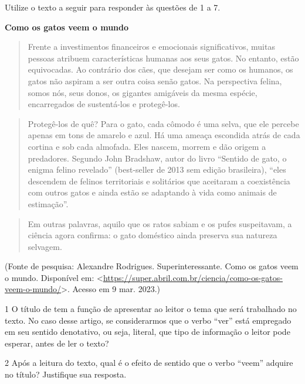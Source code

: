 Utilize o texto a seguir para responder às questões de 1 a 7.

\textbf{Como os gatos veem o mundo}

\begin{quote}
Frente a investimentos financeiros e emocionais significativos, muitas
pessoas atribuem características humanas aos seus gatos. No entanto,
estão equivocadas. Ao contrário dos cães, que desejam ser como os
humanos, os gatos não aspiram a ser outra coisa senão gatos. Na
perspectiva felina, somos nós, seus donos, os gigantes amigáveis da
mesma espécie, encarregados de sustentá-los e protegê-los.
\end{quote}

\begin{quote}
Protegê-los de quê? Para o gato, cada cômodo é uma selva, que ele
percebe apenas em tons de amarelo e azul. Há uma ameaça escondida atrás
de cada cortina e sob cada almofada. Eles nascem, morrem e dão origem a
predadores. Segundo John Bradshaw, autor do livro ``Sentido de gato, o
enigma felino revelado'' (best-seller de 2013 sem edição brasileira),
``eles descendem de felinos territoriais e solitários que aceitaram a
coexistência com outros gatos e ainda estão se adaptando à vida como
animais de estimação''.
\end{quote}

\begin{quote}
Em outras palavras, aquilo que os ratos sabiam e os pufes suspeitavam, a
ciência agora confirma: o gato doméstico ainda preserva sua natureza
selvagem.
\end{quote}

(Fonte de pesquisa: Alexandre Rodrigues. Superinteressante. Como os
gatos veem o mundo. Disponível em:
\textless{}\url{https://super.abril.com.br/ciencia/como-os-gatos-veem-o-mundo/}\textgreater.
Acesso em 9 mar. 2023.)

\num{1} O título de tem a função de apresentar ao leitor o tema que será
trabalhado no texto. No caso desse artigo, se considerarmos que o verbo
``ver'' está empregado em seu sentido denotativo, ou seja, literal, que
tipo de informação o leitor pode esperar, antes de ler o texto?



\num{2} Após a leitura do texto, qual é o efeito de sentido que o verbo
``veem'' adquire no título? Justifique sua resposta.

